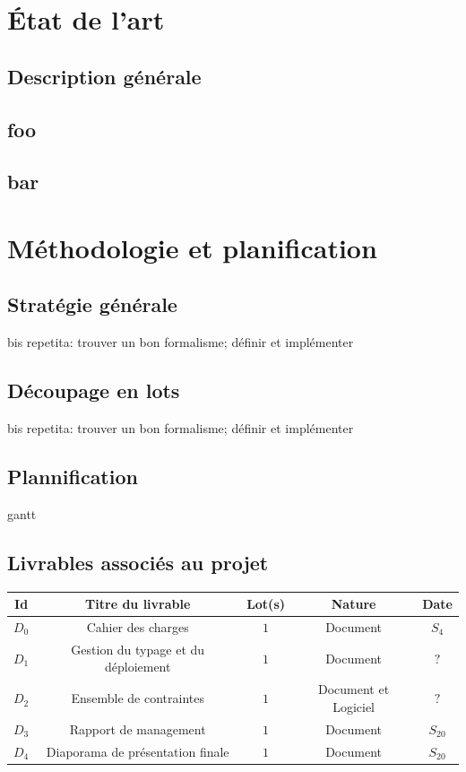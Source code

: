 \documentclass[a4paper]{article}
\begin{document}
\section{État de l'art}
\subsection{Description générale}
\subsection{foo}
\subsection{bar}

\section{Méthodologie et planification}
\subsection{Stratégie générale}
bis repetita: trouver un bon formalisme; définir et implémenter
\subsection{Découpage en lots}
bis repetita: trouver un bon formalisme; définir et implémenter
\subsection{Plannification}
gantt
\subsection{Livrables associés au projet}
\begin{table}
\centering
\begin{tabular}{c|c|c|c|c}
	Id & Titre du livrable & Lot(s) & Nature & Date \\
	\hline
	\hline
	$D_0$ & Cahier des charges & $1$ & Document & $S_4$ \\
	\hline
	$D_1$ & Gestion du typage et du déploiement & $1$ & Document & $?$ \\
	\hline
	$D_2$ & Ensemble de contraintes & $1$ & Document et Logiciel & $?$ \\
	\hline
	$D_3$ & Rapport de management & $1$ & Document & $S_{20}$ \\
	\hline
	$D_4$ & Diaporama de présentation finale & $1$ & Document & $S_{20}$ \\
\end{tabular}
\end{table}
\end{document}
